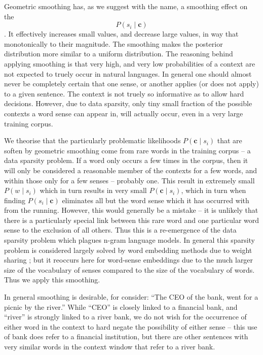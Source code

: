 \documentclass{sig-alternate}
\renewcommand{\c}{\mathbf{c}}
\begin{document}
Geometric smoothing has, as we suggest with the name, a smoothing effect on the $$P(s_{i}\mid\c)$$. It effectively increases small values, and decrease large values, in way that monotonically to their magnitude. The smoothing makes the posterior distribution more similar to a uniform distribution. The reasoning behind applying smoothing is that very high, and very low probabilities of a context are not expected to truely occur in natural languages. In general one should almost never be completely certain that one sense, or another applies (or does not apply) to a given sentence. The context is not truely so informative as to allow hard decisions. However, due to data sparsity, only tiny small fraction of the possible contexts a word sense can appear in, will actually occur, even in a very large training corpus.

We theorise that the particularly problematic likelihoods $P(\c \mid s_{i})$ that are soften by geometric smoothing come from rare words in the training corpus -- a data sparsity problem. If a word only occurs a few times in the corpus, then it will only be considered a reasonable member of the contexts for a few words, and within those only for a few senses -- probably one. This result in extremely small $P(w \mid s_i)$ which in turn results in very small $P(\c \mid s_i)$, which in turn when finding $P(s_{i} \mid \c)$ eliminates all but the word sense which it has occurred with from the running. However, this would generally be a mistake -- it is unlikely that there is a particularly special link between this rare word and one particular word sense to the exclusion of all others. Thus this is a re-emergence of the data sparsity problem which plagues n-gram language models. In general this sparsity problem is considered largely solved by word embedding methods due to weight sharing \textcite{NPLM}; but it reoccurs here for word-sense embeddings due to the much larger size of the vocabulary of senses compared to the size of the vocabulary of words. Thus we apply this smoothing.

In general smoothing is desirable, for consider: \enquote{The CEO of the bank, went for a picnic by the river.} While \enquote{CEO} is closely linked to a financial bank, and \enquote{river} is strongly linked to a river bank, we do not wish for the occurrence of either word in the context to hard negate the possibility of either sense -- this use of bank does refer to a financial institution, but there are other sentences with very similar words in the context window that refer to a river bank.
\end{document}

